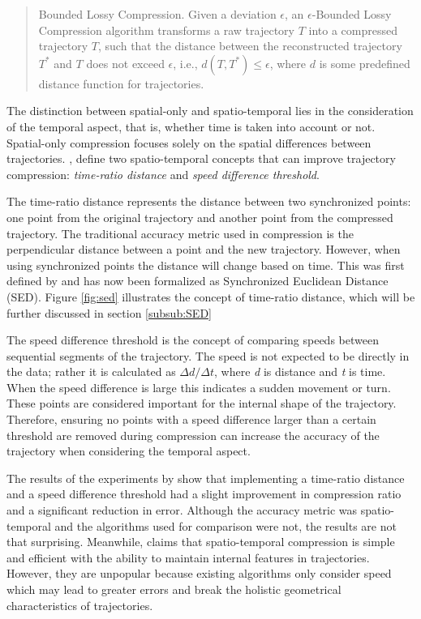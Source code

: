 \begin{quote}
    \begin{definition}\label{def:bounded_lossy}
        Bounded Lossy Compression. Given a deviation $\epsilon$, an $\epsilon$-Bounded Lossy Compression algorithm transforms a raw trajectory $T$ into a compressed trajectory $T$, such that the distance between the reconstructed trajectory $T^*$ and $T$ does not exceed $\epsilon$, i.e., $d(T,T^*) \leq \epsilon$, where $d$ is some predefined distance function for trajectories.
    \end{definition}
\end{quote}

The distinction between spatial-only and spatio-temporal lies in the consideration of the temporal aspect, that is, whether time is taken into account or not. Spatial-only compression focuses solely on the spatial differences between trajectories. \textcite{SpatiotemporalComp}, define two spatio-temporal concepts that can improve trajectory compression: \textit{time-ratio distance} and \textit{speed difference threshold}.

The time-ratio distance represents the distance between two synchronized points: one point from the original trajectory and another point from the compressed trajectory. The traditional accuracy metric used in compression is the perpendicular distance between a point and the new trajectory. However, when using synchronized points the distance will change based on time. This was first defined by \textcite{SpatiotemporalComp} and has now been formalized as Synchronized Euclidean Distance (SED). Figure \ref{fig:sed} illustrates the concept of time-ratio distance, which will be further discussed in section \ref{subsub:SED}

The speed difference threshold is the concept of comparing speeds between sequential segments of the trajectory. The speed is not expected to be directly in the data; rather it is calculated as $ \Delta d / \Delta t $, where \textit{d} is distance and \textit{t} is time. When the speed difference is large this indicates a sudden movement or turn. These points are considered important for the internal shape of the trajectory. Therefore, ensuring no points with a speed difference larger than a certain threshold are removed during compression can increase the accuracy of the trajectory when considering the temporal aspect.

The results of the experiments by \textcite{SpatiotemporalComp} show that implementing a time-ratio distance and a speed difference threshold had a slight improvement in compression ratio and a significant reduction in error. Although the accuracy metric was spatio-temporal and the algorithms used for comparison were not, the results are not that surprising. Meanwhile, \textcite{Sun2016} claims that spatio-temporal compression is simple and efficient with the ability to maintain internal features in trajectories. However, they are unpopular because existing algorithms only consider speed which may lead to greater errors and break the holistic geometrical characteristics of trajectories.


